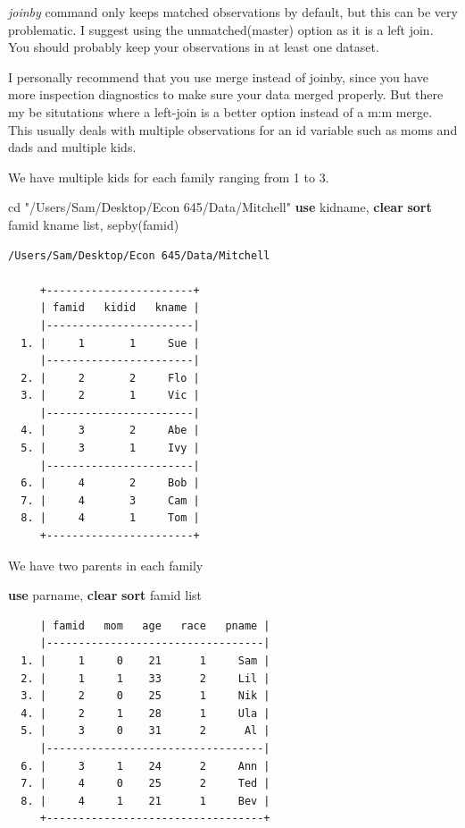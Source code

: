 \documentclass[
]{book}
\newenvironment{Shaded}{\begin{snugshade}}{\end{snugshade}}
\newcommand{\KeywordTok}[1]{\textcolor[rgb]{0.13,0.29,0.53}{\textbf{#1}}}
\newcommand{\NormalTok}[1]{#1}
\newcommand{\OtherTok}[1]{\textcolor[rgb]{0.56,0.35,0.01}{#1}}
\newcommand{\StringTok}[1]{\textcolor[rgb]{0.31,0.60,0.02}{#1}}
\begin{document}
\emph{joinby} command only keeps matched observations by default, but this can be
very problematic. I suggest using the unmatched(master) option as it is a
left join. You should probably keep your observations in at least one dataset.

I personally recommend that you use merge instead of joinby, since you have
more inspection diagnostics to make sure your data merged properly. But there
my be situtations where a left-join is a better option instead of a m:m merge.
This usually deals with multiple observations for an id variable such as
moms and dads and multiple kids.

We have multiple kids for each family ranging from 1 to 3.

\begin{Shaded}
\begin{Highlighting}[]
\NormalTok{cd }\StringTok{"/Users/Sam/Desktop/Econ 645/Data/Mitchell"}
\KeywordTok{use}\NormalTok{ kidname, }\KeywordTok{clear}
\KeywordTok{sort}\NormalTok{ famid kname}
\OtherTok{list}\NormalTok{, sepby(famid)}
\end{Highlighting}
\end{Shaded}

\begin{verbatim}
/Users/Sam/Desktop/Econ 645/Data/Mitchell

     +-----------------------+
     | famid   kidid   kname |
     |-----------------------|
  1. |     1       1     Sue |
     |-----------------------|
  2. |     2       2     Flo |
  3. |     2       1     Vic |
     |-----------------------|
  4. |     3       2     Abe |
  5. |     3       1     Ivy |
     |-----------------------|
  6. |     4       2     Bob |
  7. |     4       3     Cam |
  8. |     4       1     Tom |
     +-----------------------+
\end{verbatim}

We have two parents in each family

\begin{Shaded}
\begin{Highlighting}[]
\KeywordTok{use}\NormalTok{ parname, }\KeywordTok{clear}
\KeywordTok{sort}\NormalTok{ famid}
\OtherTok{list}
\end{Highlighting}
\end{Shaded}

\begin{verbatim}
     | famid   mom   age   race   pname |
     |----------------------------------|
  1. |     1     0    21      1     Sam |
  2. |     1     1    33      2     Lil |
  3. |     2     0    25      1     Nik |
  4. |     2     1    28      1     Ula |
  5. |     3     0    31      2      Al |
     |----------------------------------|
  6. |     3     1    24      2     Ann |
  7. |     4     0    25      2     Ted |
  8. |     4     1    21      1     Bev |
     +----------------------------------+
\end{verbatim}
\end{document}

